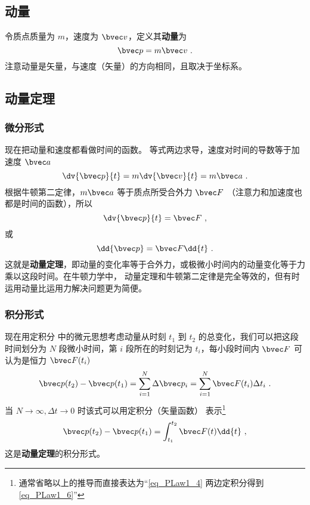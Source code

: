 
\subsection{动量}
令质点质量为 $m$，速度为 $\bvec v$，定义其\textbf{动量}为
\begin{equation}
\bvec p = m\bvec v~.
\end{equation}
注意动量是矢量，与速度（矢量）的方向相同，且取决于坐标系。

\subsection{动量定理}
\subsubsection{微分形式}
现在把动量和速度都看做时间的函数。 等式两边求导，速度对时间的导数等于加速度 $\bvec a$
\begin{equation}
\dv{\bvec p}{t} = m \dv{\bvec v}{t} = m\bvec a~.
\end{equation}
根据牛顿第二定律，$m\bvec a$ 等于质点所受合外力 $\bvec F$ （注意力和加速度也都是时间的函数），所以
\begin{equation}
\dv{\bvec p}{t} = \bvec F~,
\end{equation}
或
\begin{equation}\label{eq_PLaw1_4}
\dd{\bvec p} = \bvec F \dd{t}~.
\end{equation}
这就是\textbf{动量定理}，即动量的变化率等于合外力，或极微小时间内的动量变化等于力乘以这段时间。在牛顿力学中， 动量定理和牛顿第二定律是完全等效的，但有时运用动量比运用力解决问题更为简便。
\subsubsection{积分形式}
现在用定积分 中的微元思想考虑动量从时刻 $t_1$ 到 $t_2$ 的总变化，我们可以把这段时间划分为 $N$ 段微小时间，第 $i$ 段所在的时刻记为 $t_i$，每小段时间内 $\bvec F$ 可认为是恒力 $\bvec F(t_i)$
\begin{equation}
\bvec p(t_2)-\bvec p(t_1) = \sum_{i=1}^{N} \Delta\bvec p_i= \sum_{i=1}^{N} \bvec F(t_i) \Delta t_i~.
\end{equation}
当 $N\to\infty, \Delta t\to 0$ 时该式可以用定积分（矢量函数）%
表示\footnote{通常省略以上的推导而直接表达为“\autoref{eq_PLaw1_4} 两边定积分得到\autoref{eq_PLaw1_6}”}
\begin{equation}\label{eq_PLaw1_6}
\bvec p(t_2)-\bvec p(t_1) = \int_{t_1}^{t_2}\bvec F(t) \dd{t}~,
\end{equation}
这是\textbf{动量定理}的积分形式。

